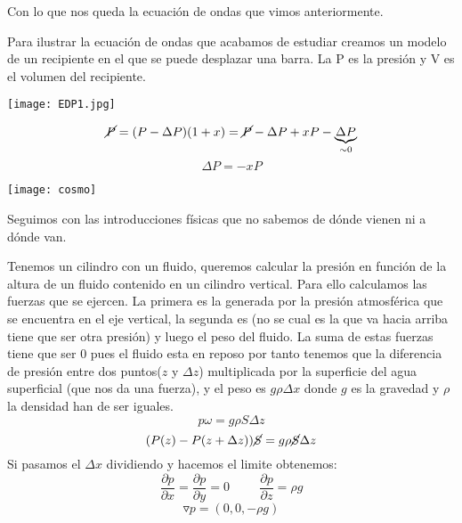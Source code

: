 \documentclass[openany]{book}
\begin{document}
Con lo que nos queda la ecuación de ondas que vimos anteriormente.





Para ilustrar la ecuación de ondas que acabamos de estudiar creamos un modelo de un recipiente en el que se puede desplazar una barra. La P es la presión y V es el volumen del recipiente.

\begin{center}
  \texttt{[image: EDP1.jpg]}
\end{center}
$$ \cancel{P} = (P-\Delta P)(1+x)= \cancel{P} - \Delta P +xP -\underbrace{\Delta P}_{\sim 0} $$
$$ \Delta P = -xP $$

\begin{minipage}[l]{0.1\textwidth}
 \texttt{[image: cosmo]}
 \end{minipage}
 \begin{minipage}[l]{0.8\textwidth}
 Seguimos con las introducciones físicas que no sabemos de dónde vienen ni a dónde van.
 \end{minipage}


Tenemos un cilindro con un fluido, queremos calcular la presión en función de la altura de un fluido contenido en un cilindro vertical. Para ello calculamos las fuerzas que se ejercen.
La primera es la generada por la presión atmosférica que se encuentra en el eje vertical, la segunda es (no se cual es la que va hacia arriba tiene que ser otra presión) y luego el peso del fluido. La suma de estas fuerzas tiene que ser 0 pues el fluido esta en reposo por tanto tenemos que la diferencia de presión entre dos puntos($z$ y $\Delta z$) multiplicada por la superficie del agua superficial (que nos da una fuerza), y el peso es $g\rho \Delta x$ donde $g$ es la gravedad y $\rho$ la densidad han de ser iguales.
 $$ p\omega = g \rho S \Delta z $$
 $$ (P(z)-P(z+\Delta z))\cancel S = g \rho \cancel{S} \Delta z $$
 Si pasamos el $\Delta x$ dividiendo y hacemos el limite obtenemos:
 $$ \dfrac{\partial p}{\partial x} = \dfrac{\partial p}{\partial y}=0  \hspace{1cm} \dfrac{\partial p}{\partial z} = \rho g $$
$$ \triangledown p = (0,0,-\rho g) $$
\end{document}
